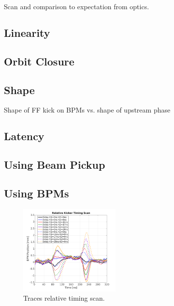 Scan and comparison to expectation from optics.

\subsection{Linearity}
\label{ss:kickLin}

\subsection{Orbit Closure}
\label{ss:orbitClosure}

\subsection{Shape}
\label{ss:kickShape}

Shape of FF kick on BPMs vs. shape of upstream phase


\subsection{Latency}
\label{ss:measLatency}

\subsection{Using Beam Pickup}
\label{ss:beamPickup}

\subsection{Using BPMs}
\label{ss:relativeBPM}


\begin{figure}
  \centering
  \includegraphics[width=0.45\textwidth]{Figures/relativeTimingScan_traces}
  \caption{Traces relative timing scan.}
  \label{f:relativeTimingScan_traces}
\end{figure}

